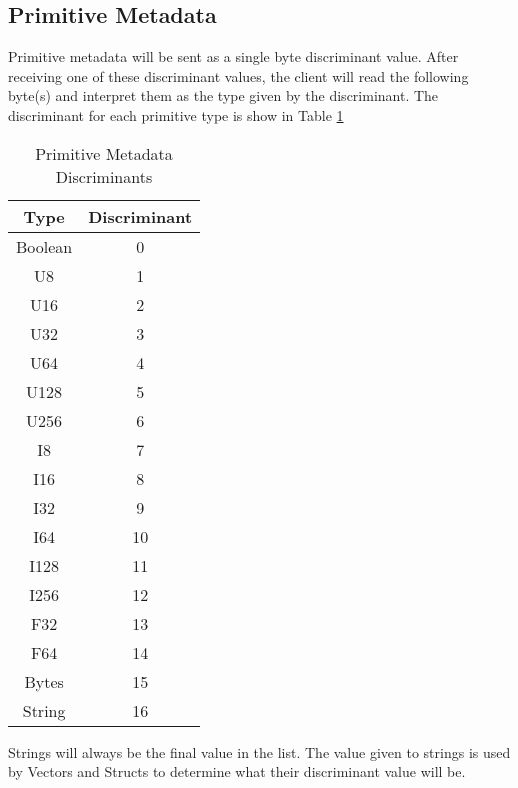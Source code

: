 \documentclass[conference]{IEEEtran}
\begin{document}
\subsection{Primitive Metadata}

Primitive metadata will be sent as a single byte discriminant value. After receiving one of these discriminant values, the client will read the following byte(s) and interpret them as the type given by the discriminant. The discriminant for each primitive type is show in Table \ref{discriminants}

\begin{table}[htbp]
	\caption{Primitive Metadata Discriminants}\label{discriminants}
	\begin{center}
		\begin{tabular}{|c|c|}
			\hline
			\textbf{Type} & \textbf{Discriminant} \\
			\hline
			Boolean       & 0                     \\
			U8            & 1                     \\
			U16           & 2                     \\
			U32           & 3                     \\
			U64           & 4                     \\
			U128          & 5                     \\
			U256          & 6                     \\
			I8            & 7                     \\
			I16           & 8                     \\
			I32           & 9                     \\
			I64           & 10                    \\
			I128          & 11                    \\
			I256          & 12                    \\
			F32           & 13                    \\
			F64           & 14                    \\
			Bytes         & 15                    \\
			String        & 16                    \\
			\hline
		\end{tabular}
	\end{center}
\end{table}

Strings will always be the final value in the list. The value given to strings
is used by Vectors and Structs to determine what their discriminant value will
be.
\end{document}
